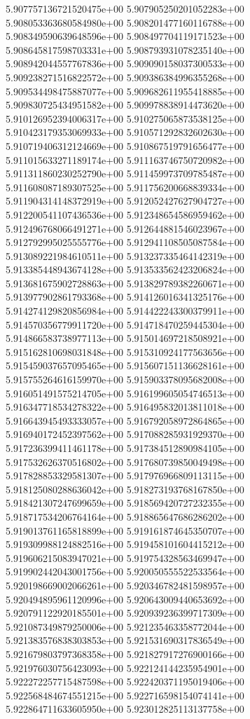 5.907757136721520475e+00
5.907905250201052283e+00
5.908053363680584980e+00
5.908201477160116788e+00
5.908349590639648596e+00
5.908497704119171523e+00
5.908645817598703331e+00
5.908793931078235140e+00
5.908942044557767836e+00
5.909090158037300533e+00
5.909238271516822572e+00
5.909386384996355268e+00
5.909534498475887077e+00
5.909682611955418885e+00
5.909830725434951582e+00
5.909978838914473620e+00
5.910126952394006317e+00
5.910275065873538125e+00
5.910423179353069933e+00
5.910571292832602630e+00
5.910719406312124669e+00
5.910867519791656477e+00
5.911015633271189174e+00
5.911163746750720982e+00
5.911311860230252790e+00
5.911459973709785487e+00
5.911608087189307525e+00
5.911756200668839334e+00
5.911904314148372919e+00
5.912052427627904727e+00
5.912200541107436536e+00
5.912348654586959462e+00
5.912496768066491271e+00
5.912644881546023967e+00
5.912792995025555776e+00
5.912941108505087584e+00
5.913089221984610511e+00
5.913237335464142319e+00
5.913385448943674128e+00
5.913533562423206824e+00
5.913681675902728863e+00
5.913829789382260671e+00
5.913977902861793368e+00
5.914126016341325176e+00
5.914274129820856984e+00
5.914422243300379911e+00
5.914570356779911720e+00
5.914718470259445304e+00
5.914866583738977113e+00
5.915014697218508921e+00
5.915162810698031848e+00
5.915310924177563656e+00
5.915459037657095465e+00
5.915607151136628161e+00
5.915755264616159970e+00
5.915903378095682008e+00
5.916051491575214705e+00
5.916199605054746513e+00
5.916347718534278322e+00
5.916495832013811018e+00
5.916643945493333057e+00
5.916792058972864865e+00
5.916940172452397562e+00
5.917088285931929370e+00
5.917236399411461178e+00
5.917384512890984105e+00
5.917532626370516802e+00
5.917680739850049498e+00
5.917828853329581307e+00
5.917976966809113115e+00
5.918125080288636042e+00
5.918273193768167850e+00
5.918421307247699659e+00
5.918569420727232355e+00
5.918717534206764164e+00
5.918865647686286202e+00
5.919013761165818899e+00
5.919161874645350707e+00
5.919309988124882516e+00
5.919458101604415212e+00
5.919606215083947021e+00
5.919754328563469947e+00
5.919902442043001756e+00
5.920050555522533564e+00
5.920198669002066261e+00
5.920346782481598957e+00
5.920494895961120996e+00
5.920643009440653692e+00
5.920791122920185501e+00
5.920939236399717309e+00
5.921087349879250006e+00
5.921235463358772044e+00
5.921383576838303853e+00
5.921531690317836549e+00
5.921679803797368358e+00
5.921827917276900166e+00
5.921976030756423093e+00
5.922124144235954901e+00
5.922272257715487598e+00
5.922420371195019406e+00
5.922568484674551215e+00
5.922716598154074141e+00
5.922864711633605950e+00
5.923012825113137758e+00
